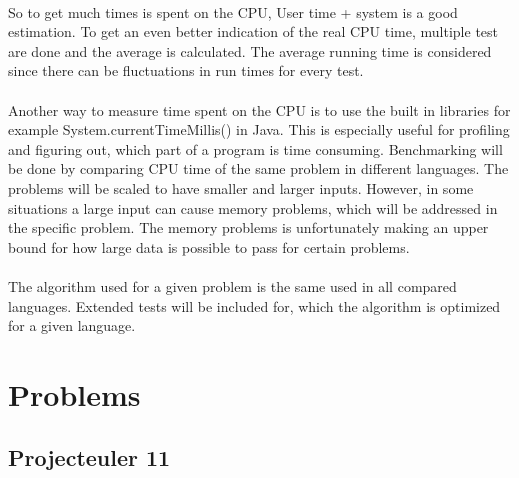 \documentclass[a4paper, 11pt, titlepage]{article}
\begin{document}
\\
So to get much times is spent on the CPU, User time + system is a good estimation. To get an even better indication of the real CPU time, multiple test are done and the average is calculated. The average running time is considered since there can be fluctuations in run times for every test. \\
\\
Another way to measure time spent on the CPU is to use the built in libraries for example System.currentTimeMillis() in Java. This is especially useful for profiling and figuring out, which part of a program is time consuming.
Benchmarking will be done by comparing CPU time of the same problem in different languages. The problems will be scaled to have smaller and larger inputs. However, in some situations a large input can cause memory problems, which will be addressed in the specific problem. The memory problems is unfortunately making an upper bound for how large data is possible to pass for certain problems. \\
\\
The algorithm used for a given problem is the same used in all compared languages. Extended tests will be included for, which the algorithm is optimized for a given language.

\section{Problems}
\subsection{Projecteuler 11}
\end{document}
